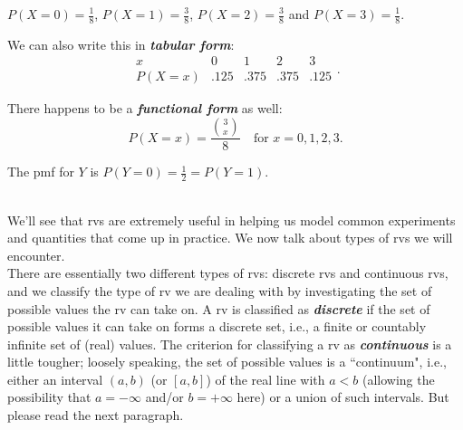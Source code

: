 \documentclass[12pt]{article}
\begin{document}
\begin{center}$P(X=0) = \frac 18$, $P(X=1) = \frac 38$, $P(X=2)=\frac 38$ and $P(X=3)=\frac 18$.\end{center}

\noindent We can also write this in {\bf\em tabular form}\label{e:tabularform}:
$$\displaystyle \begin{array}{c||cccc|}x & 0 & 1 & 2 & 3\\ \hline P(X=x) & .125 & .375 & .375 & .125\end{array}.$$

\bigskip

\noindent There happens to be a {\bf\em functional form}\label{e:functionalformpmf} as well:
$$P(X=x)=\dfrac {{3\choose x}}8\quad \mbox{for }x=0,1,2,3.$$

\bigskip

\noindent The pmf for $Y$ is $P(Y=0)=\frac 12 = P(Y=1)$.






\newpage




\label{typesofrvs1}\\
\noindent We'll see that rvs are extremely useful in helping us model common experiments and quantities that come up in practice. We now talk about types of rvs we will encounter.\\


\noindent There are essentially two different types of rvs: discrete rvs and continuous rvs, and
we classify the type of rv we are dealing with by investigating the set of possible values the rv can take on. A rv is classified
as {\bf\em discrete}\label{e:discreterv} if the set of possible values it can take on forms a discrete set, i.e., a finite or countably infinite
set of (real) values.  The criterion for classifying a rv as {\bf\em continuous} is a little tougher; loosely speaking, the set of possible values is a ``continuum", i.e., either
an interval $(a,b)$ (or $[a,b]$) of the real line with $a<b$ (allowing the possibility that $a=-\infty$ and/or $b=+\infty$ here) or a union of such intervals.  But please read the next paragraph.\\
\end{document}

